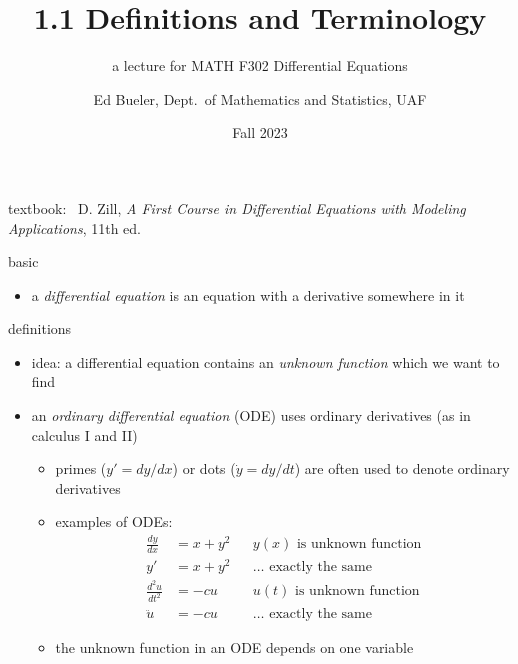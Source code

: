 \documentclass{beamer}
\title{1.1 Definitions and Terminology}
\subtitle{a lecture for MATH F302 Differential Equations}
\date{Fall 2023}
\author{Ed Bueler, Dept.~of Mathematics and Statistics, UAF}
\begin{document}


\begin{frame}
\titlepage

\centerline{\tiny textbook: \, D. Zill, \emph{A First Course in Differential Equations with Modeling Applications}, 11th ed.}
\end{frame}

\begin{frame}{basic}

\begin{itemize}
\item a \emph{differential equation} is an equation with a derivative somewhere in it
\end{itemize}
\end{frame}

\begin{frame}{definitions}

\begin{itemize}
\item idea: a differential equation contains an \emph{unknown function} which we want to find

\bigskip
\item an \alert{\emph{ordinary differential equation} (ODE)} uses ordinary derivatives (as in calculus I and II)
    \begin{itemize}
    \item primes ($y' = dy/dx$) or dots ($\dot y = dy/dt$) are often used to denote ordinary derivatives
    \item examples of ODEs:
\begin{align*}
\frac{dy}{dx} &= x + y^2 && y(x) \text{ is unknown function} \\
y' &= x + y^2 && \dots \text{ exactly the same} \\
\frac{d^2 u}{dt^2} &= - c u && u(t) \text{ is unknown function} \\
\ddot u &= - c u && \dots \text{ exactly the same}
\end{align*}
    \item the unknown function in an ODE \alert{depends on one variable}
    \end{itemize}
\end{itemize}
\end{frame}
\end{document}
